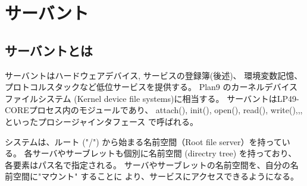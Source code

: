 \begin{comment}
\section{フロッピーの接続法(参考)}

    ◎フロッピードライバの接続  

      〇 フロッピードライバは bindコマンドで接続され、/dev/fd0disk として見えるようになる。

\begin{verbatim}
          LP49[/]: bind -a #f /dev      ←  Floppy が /dev/fd0disk として接続される
                                            #f はフロッピードライバを意味する
                                            -a は after の略で /dev の最後に接続する
          LP49[/]: ls  /dev           ←    fd0disk, fd0ctl などが見える
\end{verbatim}
    

    【参考】簡易シェル qsh.c では、スタート時に以下の dosstart( ) を実行している。

\begin{verbatim}
            int dosstart() {
                chdir("/");
                bind("#s", "/srv", 4);
                bind("#f", "/dev", 2);
                fd = open("/srv/dos", ORDWR);
                rc = mount(fd, -1, "/t", 2, "/dev/fd0disk");
                return  rc;
             }      
\end{verbatim}

\end{comment}


\chapter{サーバント} 
\section{サーバントとは}

   サーバントはハードウェアデバイス, サービスの登録簿(後述)、
   環境変数記憶、プロトコルスタックなど低位サービスを提供する。
   Plan9 のカーネルデバイスファイルシステム (Kernel device file systems)に相当する。
   サーバントはLP49-COREプロセス内のモジュールであり、
   attach(), init(), open(), read(), write(),,, といったプロシージャインタフェース
   で呼ばれる。

    システムは、ルート ("/") から始まる名前空間（Root file server）を持っている。
    各サーバやサーブレットも個別に名前空間 (directry tree) を持っており、
    各要素はパス名で指定される。
    サーバやサーブレットの名前空間を、自分の名前空間に"マウント" することに
    より、サービスにアクセスできるようになる。\\


